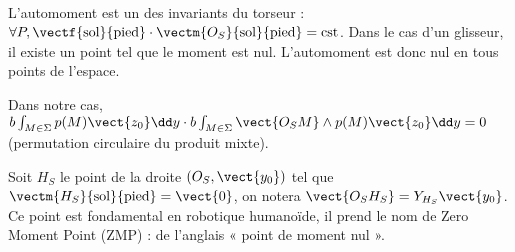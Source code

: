\fi

\ifprof
\begin{corrige}~\\
L'automoment est un des invariants du torseur : $\forall P, \vectf{\text{sol}}{\text{pied}}\cdot\vectm{O_S}{\text{sol}}{\text{pied}}=\text{cst}$. Dans le cas d'un glisseur, il existe un point tel que le moment est nul. L'automoment est donc nul en tous points de l'espace.

Dans notre cas, $b\int_{M\in\Sigma} p(M)\vect{z_0} \dd y \cdot b\int_{M\in\Sigma} \vect{O_S M} \wedge p(M)\vect{z_0} \dd y = 0$ (permutation circulaire du produit mixte). 


 
\end{corrige}
\else
\fi

\ifprof
\else

Soit $H_S$ le point de la droite $\left(O_S,\vect{y_0}\right)$ tel que  
$\vectm{H_S}{\text{sol}}{\text{pied}}=\vect{0}$, on notera $\vect{O_SH_S} = Y_{H_S}\vect{y_0}$. Ce point est
fondamental en robotique humanoïde, il prend le nom de Zero Moment Point (ZMP) : de l'anglais « point de
moment nul ».

\fi


